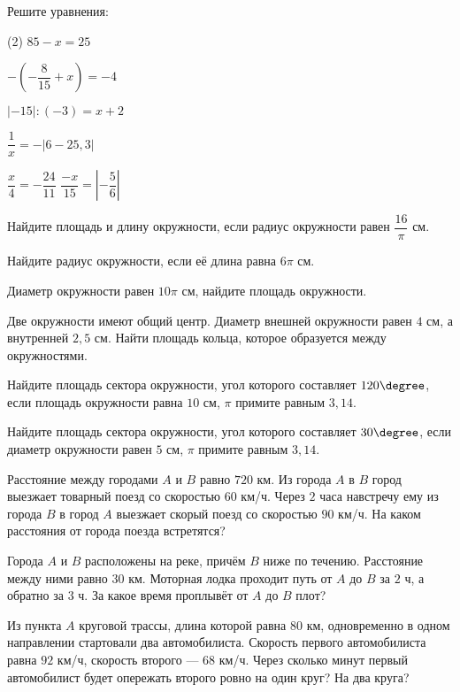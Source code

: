 \begin{class}[number=6]
	\begin{listofex}
		\item Решите уравнения:
		\begin{tasks}(2)
			\task \( 85-x=25 \)
			
			\task \( -\left( -\dfrac{8}{15} + x \right) = -4 \)
			
			\task \( |-15|:(-3)=x+2 \)
			
			\task \( \dfrac{1}{x} = -|6-25,3| \)
			
			\task \( \dfrac{x}{4} = -\dfrac{24}{11} \)
			\task \( \dfrac{-x}{15} = \left| -\dfrac{5}{6} \right| \)
		\end{tasks}
		\item Найдите площадь и длину окружности, если радиус окружности равен \( \dfrac{16}{\pi} \) см.
		\item Найдите радиус окружности, если её длина равна \( 6\pi \) см.
		\item Диаметр окружности равен \(10\pi\) см, найдите площадь окружности.
		\item Две окружности имеют общий центр. Диаметр внешней окружности равен \(4\) см, а внутренней \(2,5\) см. Найти площадь кольца, которое образуется между окружностями.
		\item Найдите площадь сектора окружности, угол которого составляет \(120 \degree\), если площадь окружности равна \( 10 \) см, \(\pi\) примите равным \(3,14\).
		\item Найдите площадь сектора окружности, угол которого составляет \(30 \degree\), если диаметр окружности равен \( 5 \) см, \(\pi\) примите равным \(3,14\).
		\item Расстояние между городами \(A\) и \(B\) равно \(720\) км. Из города \(A\) в \(B\) город выезжает товарный поезд со скоростью \(60\) км/ч. Через \(2\) часа навстречу ему из города \(B\) в город \(A\) выезжает скорый поезд со скоростью \(90\) км/ч. На каком расстояния от города поезда встретятся?
		
		 \item Города \(A\) и \(B\) расположены на реке, причём \(B\) ниже по течению. Расстояние между ними равно \(30\) км. Моторная лодка проходит путь от \(A\) до \(B\) за \(2\) ч, а обратно за \(3\) ч. За какое время проплывёт от \(A\) до \(B\) плот?
		\item Из пункта \(A\) круговой трассы, длина которой равна \(80\) км, одновременно в одном направлении стартовали два автомобилиста. Скорость первого автомобилиста равна \(92\) км/ч, скорость второго --- \(68\) км/ч. Через сколько минут первый автомобилист будет опережать второго ровно на один круг? На два круга?
	\end{listofex}
\end{class}
